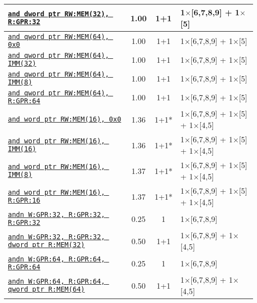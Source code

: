 \documentclass[a4paper,english,fontsize=9]{scrartcl}
\begin{document}
\begin{longtable}{p{}ccL{.25\textwidth}}
  \midrule
  \texttt{\href{https://felixcloutier.com/x86/AND.html}{and dword ptr RW:MEM(32), R:GPR:32}} & 1.00 & 1+1 & 1\(\times\)[6,7,8,9] + 1\(\times\)[5] \\
  \midrule
  \texttt{\href{https://felixcloutier.com/x86/AND.html}{and qword ptr RW:MEM(64), 0x0}} & 1.00 & 1+1 & 1\(\times\)[6,7,8,9] + 1\(\times\)[5] \\
  \midrule
  \texttt{\href{https://felixcloutier.com/x86/AND.html}{and qword ptr RW:MEM(64), IMM(32)}} & 1.00 & 1+1 & 1\(\times\)[6,7,8,9] + 1\(\times\)[5] \\
  \midrule
  \texttt{\href{https://felixcloutier.com/x86/AND.html}{and qword ptr RW:MEM(64), IMM(8)}} & 1.00 & 1+1 & 1\(\times\)[6,7,8,9] + 1\(\times\)[5] \\
  \midrule
  \texttt{\href{https://felixcloutier.com/x86/AND.html}{and qword ptr RW:MEM(64), R:GPR:64}} & 1.00 & 1+1 & 1\(\times\)[6,7,8,9] + 1\(\times\)[5] \\
  \midrule
  \texttt{\href{https://felixcloutier.com/x86/AND.html}{and word ptr RW:MEM(16), 0x0}} & 1.36 & 1+1* & 1\(\times\)[6,7,8,9] + 1\(\times\)[5] + 1\(\times\)[4,5] \\
  \midrule
  \texttt{\href{https://felixcloutier.com/x86/AND.html}{and word ptr RW:MEM(16), IMM(16)}} & 1.36 & 1+1* & 1\(\times\)[6,7,8,9] + 1\(\times\)[5] + 1\(\times\)[4,5] \\
  \midrule
  \texttt{\href{https://felixcloutier.com/x86/AND.html}{and word ptr RW:MEM(16), IMM(8)}} & 1.37 & 1+1* & 1\(\times\)[6,7,8,9] + 1\(\times\)[5] + 1\(\times\)[4,5] \\
  \midrule
  \texttt{\href{https://felixcloutier.com/x86/AND.html}{and word ptr RW:MEM(16), R:GPR:16}} & 1.37 & 1+1* & 1\(\times\)[6,7,8,9] + 1\(\times\)[5] + 1\(\times\)[4,5] \\
  \midrule
  \texttt{\href{https://felixcloutier.com/x86/ANDN.html}{andn W:GPR:32, R:GPR:32, R:GPR:32}} & 0.25 & 1 & 1\(\times\)[6,7,8,9] \\
  \midrule
  \texttt{\href{https://felixcloutier.com/x86/ANDN.html}{andn W:GPR:32, R:GPR:32, dword ptr R:MEM(32)}} & 0.50 & 1+1 & 1\(\times\)[6,7,8,9] + 1\(\times\)[4,5] \\
  \midrule
  \texttt{\href{https://felixcloutier.com/x86/ANDN.html}{andn W:GPR:64, R:GPR:64, R:GPR:64}} & 0.25 & 1 & 1\(\times\)[6,7,8,9] \\
  \midrule
  \texttt{\href{https://felixcloutier.com/x86/ANDN.html}{andn W:GPR:64, R:GPR:64, qword ptr R:MEM(64)}} & 0.50 & 1+1 & 1\(\times\)[6,7,8,9] + 1\(\times\)[4,5] \\

\end{longtable}
\end{document}
